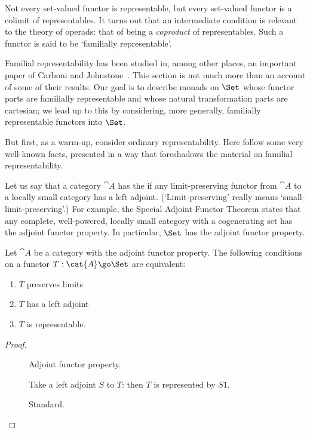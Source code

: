 %
%
Not every set-valued functor is representable, but every set-valued functor
is a colimit of representables.  It turns out that an intermediate
condition is relevant to the theory of operads: that of being a
\emph{coproduct} of representables.  Such a functor is said to be
`familially representable'.  

Familial representability has been studied in, among other places, an
important paper of Carboni%
%
%
and Johnstone~\cite{CJ}.%
%
%
 This section is not
much more than an account of some of their results.  Our goal is to
describe monads on $\Set$ whose functor parts are familially representable
and whose natural transformation parts are cartesian; we lead up to this by
considering, more generally, familially representable functors into $\Set$.

But first, as a warm-up, consider ordinary representability.  Here follow
some very well-known facts, presented in a way that foreshadows the
material on familial representability.

Let us say that a category $\cat{A}$ has the  if any limit-preserving functor from $\cat{A}$ to a locally small
category has a left adjoint.  (`Limit-preserving' really means
`small-limit-preserving'.)  For example, the Special Adjoint Functor
Theorem states that any complete, well-powered, locally small category with
a cogenerating set has the adjoint functor property.  In particular, $\Set$
has the adjoint functor property.

\begin{propn}	
Let $\cat{A}$ be a category with the adjoint functor property.  The
following conditions on a functor $T: \cat{A} \go \Set$ are equivalent:
%
\begin{enumerate}
\item	{}
$T$ preserves limits
\item 	{}
$T$ has a left adjoint
\item 	{}
$T$ is representable.
\end{enumerate}
\end{propn}
%
\begin{proof}
\begin{description}
\item[\implies{}] Adjoint functor
property.
\item[\implies{}] Take a left
adjoint $S$ to $T$: then
$T$ is represented by $S1$.
\item[\implies{}] Standard.
\done
\end{description}
\end{proof}

